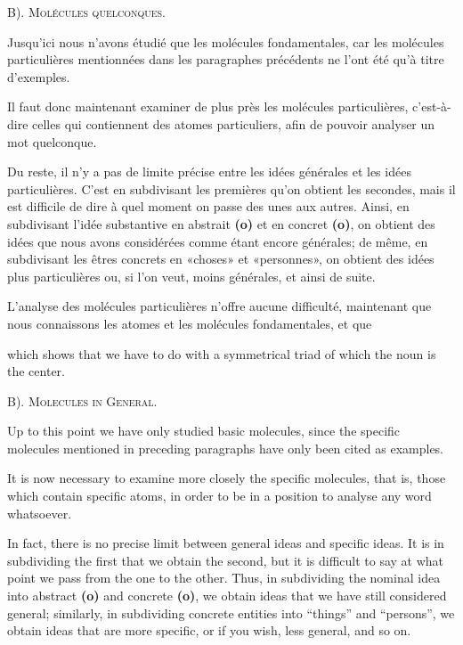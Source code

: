 \begin{sloppypar}
{  \begin{center}
    B). \textsc{Molécules quelconques}.
  \end{center}


  Jusqu’ici nous n’avons étudié que les molécules fondamentales, car
  les molécules particulières mentionnées dans les paragraphes
  précédents ne l’ont été qu’à titre d’exemples.

  Il faut donc maintenant examiner de plus près les molécules
  particulières, c’est-à-dire celles qui contiennent des atomes
  particuliers, afin de pouvoir analyser un mot quelconque.

  Du reste, il n’y a pas de limite précise entre les idées générales
  et les idées particulières. C’est en subdivisant les premières qu’on
  obtient les secondes, mais il est difficile de dire à quel moment on
  passe des unes aux autres. Ainsi, en subdivisant l’idée substantive
  en abstrait \textbf{(o)} et en concret \textbf{(o)}, on
  obtient des idées que nous avons considérées comme étant encore
  générales; de même, en subdivisant les êtres concrets en «choses» et
  «personnes», on obtient des idées plus particulières ou, si l’on
  veut, moins générales, et ainsi de suite.

  L’analyse des molécules particulières n’offre aucune difficulté,
  maintenant que nous connaissons les atomes et les molécules
  fondamentales, et que

}
%
{\noindent
  which shows that we have to do with a symmetrical triad of which the
  noun is the center.

  \begin{center}
    B). \textsc{Molecules in General}.
  \end{center}

  Up to this point we have only studied basic molecules, since the
  specific molecules mentioned in preceding paragraphs have only been
  cited as examples.

  It is now necessary to examine more closely the specific molecules,
  that is, those which contain specific atoms, in order to be in a
  position to analyse any word whatsoever.

  In fact, there is no precise limit between general ideas and
  specific ideas. It is in subdividing the first that we obtain the
  second, but it is difficult to say at what point we pass from the
  one to the other. Thus, in subdividing the nominal idea into abstract
  \textbf{(o)} and concrete \textbf{(o)}, we obtain ideas
  that we have still considered general; similarly, in subdividing
  concrete entities into ``things'' and ``persons'', we obtain ideas
  that are more specific, or if you wish, less general, and so on.

}
\end{sloppypar}
